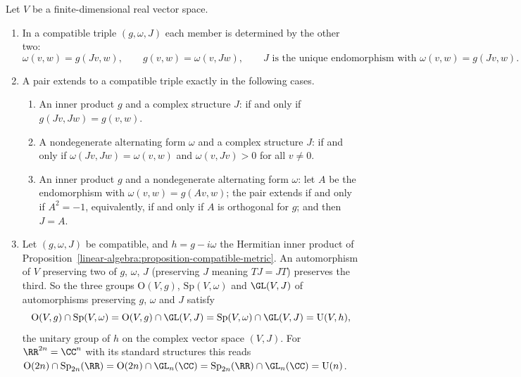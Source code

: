 \begin{proposition}\label{linear-algebra:proposition-two-of-three}
Let $V$ be a finite-dimensional real vector space.
\begin{enumerate}
\item In a compatible triple $(g, \omega, J)$ each member is determined by the other two:
\[
\omega(v, w) = g(Jv, w), \qquad g(v, w) = \omega(v, Jw), \qquad J \text{ is the unique endomorphism with } \omega(v, w) = g(Jv, w).
\]
\item A pair extends to a compatible triple exactly in the following cases.
\begin{enumerate}
\item An inner product $g$ and a complex structure $J$: if and only if $g(Jv, Jw) = g(v, w)$.
\item A nondegenerate alternating form $\omega$ and a complex structure $J$: if and only if $\omega(Jv, Jw) = \omega(v, w)$ and $\omega(v, Jv) > 0$ for all $v \neq 0$.
\item An inner product $g$ and a nondegenerate alternating form $\omega$: let $A$ be the endomorphism with $\omega(v, w) = g(Av, w)$; the pair extends if and only if $A^2 = -1$, equivalently, if and only if
$A$ is orthogonal for $g$; and then $J = A$.
\end{enumerate}
\item Let $(g, \omega, J)$ be compatible, and $h = g - i\omega$ the Hermitian inner product of Proposition~\ref{linear-algebra:proposition-compatible-metric}. An automorphism of $V$ preserving two of
$g$, $\omega$, $J$ (preserving $J$ meaning $TJ = JT$) preserves the third. So the three groups $\mathrm{O}(V, g)$, $\mathrm{Sp}(V, \omega)$ and $\GL(V, J)$ of automorphisms preserving $g$, $\omega$ and $J$
satisfy
\[
\mathrm{O}(V, g) \cap \mathrm{Sp}(V, \omega) = \mathrm{O}(V, g) \cap \GL(V, J) = \mathrm{Sp}(V, \omega) \cap \GL(V, J) = \mathrm{U}(V, h),
\]
the unitary group of $h$ on the complex vector space $(V, J)$. For $\RR^{2n} = \CC^n$ with its standard structures this reads $\mathrm{O}(2n) \cap \mathrm{Sp}_{2n}(\RR) = \mathrm{O}(2n) \cap \GL_n(\CC) =
\mathrm{Sp}_{2n}(\RR) \cap \GL_n(\CC) = \mathrm{U}(n)$.
\end{enumerate}
\end{proposition}

